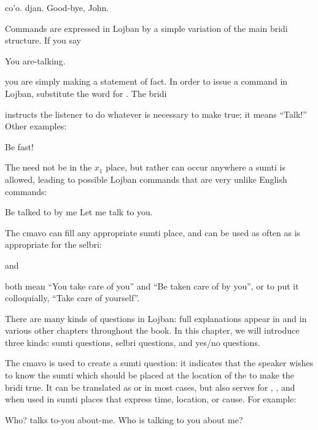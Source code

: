 \begin{example}
co'o. djan.\n
Good-bye, John.
\end{example}

Commands are expressed in Lojban by a simple variation of the main bridi structure. If you say
\begin{example}
 \n
You are-talking.
\end{example}

{\noindent}you are simply making a statement of fact. In order to issue a command in Lojban, substitute the word  for . The bridi
\begin{example}
 
\end{example}

{\noindent}instructs the listener to do whatever is necessary to make  true; it means ``Talk!'' Other examples:
\begin{example}
 \n
Be fast!
\end{example}

The  need not be in the $x_1$ place, but rather can occur anywhere a sumti is allowed, leading to possible Lojban commands that are very unlike English commands:
\begin{example}
  \n
Be talked to by me\n
Let me talk to you.
\end{example}

The cmavo  can fill any appropriate sumti place, and can be used as often as is appropriate for the selbri:
\begin{example}
  
\end{example}

{\noindent}and
\begin{example}
  
\end{example}

{\noindent}both mean ``You take care of you'' and ``Be taken care of by you'', or to put it colloquially, ``Take care of yourself''.



There are many kinds of questions in Lojban: full explanations appear in  and in various other chapters throughout the book. In this chapter, we will introduce three kinds: sumti questions, selbri questions, and yes/no questions.

The cmavo  is used to create a sumti question: it indicates that the speaker wishes to know the sumti which should be placed at the location of the  to make the bridi true. It can be translated as  or  in most cases, but also serves for , , and  when used in sumti places that express time, location, or cause. For example:
\begin{example}
   \n
Who? talks to-you about-me.\n
Who is talking to you about me?
\end{example}

